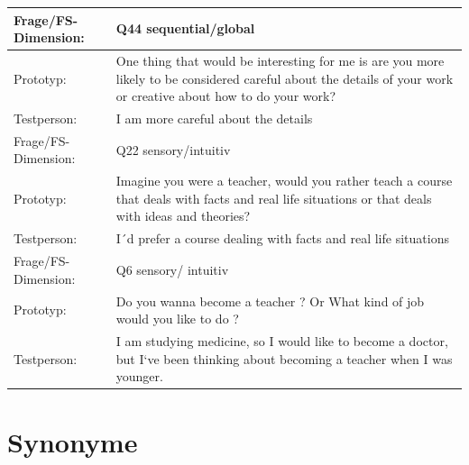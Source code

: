 \begin{longtable}{|m{2.5cm}|m{12.0cm}|}
Frage/FS-Dimension: & Q44 sequential/global \\ \hline   
\hline

Prototyp: &One thing that would be interesting for me is are you more likely to be considered
            careful about the details of your work or creative about how to do your work? \\ \hline  
Testperson: & I am more careful about the details\\ \hline
 

Frage/FS-Dimension: & Q22 sensory/intuitiv \\ \hline   
\hline

Prototyp: &Imagine you were a teacher, would you rather teach a course that deals with facts and real life situations
          or that deals with ideas and theories? \\ \hline
Testperson: & I´d prefer a course dealing with facts and real life situations\\ \hline
  

Frage/FS-Dimension: & Q6 sensory/ intuitiv \\ \hline   
\hline

Prototyp: & Do you wanna become a teacher ? Or What kind of job would you like to do ?\\ \hline
Testperson: & I am  studying medicine, so I would like to become a doctor, but I‘ve been thinking about becoming a teacher when I was younger.\\ \hline
\end{longtable}
\endgroup  


\section{Synonyme} \label{SynonymeAnhang}

